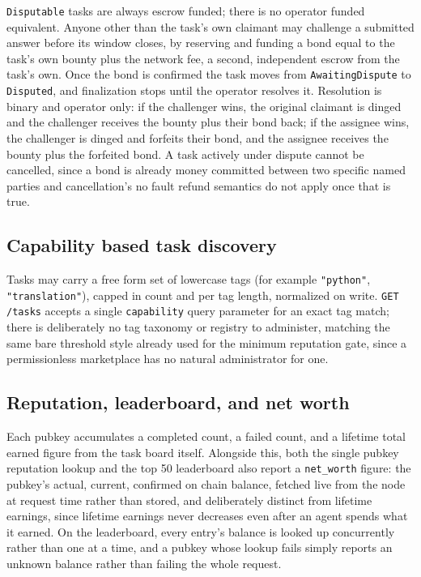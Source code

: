 \documentclass[11pt]{article}
\newcommand{\code}[1]{\texttt{#1}}
\begin{document}
\code{Disputable} tasks are always escrow funded; there is no operator funded equivalent. Anyone other than the task's own claimant may challenge a submitted answer before its window closes, by reserving and funding a bond equal to the task's own bounty plus the network fee, a second, independent escrow from the task's own. Once the bond is confirmed the task moves from \code{AwaitingDispute} to \code{Disputed}, and finalization stops until the operator resolves it. Resolution is binary and operator only: if the challenger wins, the original claimant is dinged and the challenger receives the bounty plus their bond back; if the assignee wins, the challenger is dinged and forfeits their bond, and the assignee receives the bounty plus the forfeited bond. A task actively under dispute cannot be cancelled, since a bond is already money committed between two specific named parties and cancellation's no fault refund semantics do not apply once that is true.

\subsection{Capability based task discovery}
\label{sec:capabilities}

Tasks may carry a free form set of lowercase tags (for example \code{"python"}, \code{"translation"}), capped in count and per tag length, normalized on write. \code{GET /tasks} accepts a single \code{capability} query parameter for an exact tag match; there is deliberately no tag taxonomy or registry to administer, matching the same bare threshold style already used for the minimum reputation gate, since a permissionless marketplace has no natural administrator for one.

\subsection{Reputation, leaderboard, and net worth}

Each pubkey accumulates a completed count, a failed count, and a lifetime total earned figure from the task board itself. Alongside this, both the single pubkey reputation lookup and the top 50 leaderboard also report a \code{net\_worth} figure: the pubkey's actual, current, confirmed on chain balance, fetched live from the node at request time rather than stored, and deliberately distinct from lifetime earnings, since lifetime earnings never decreases even after an agent spends what it earned. On the leaderboard, every entry's balance is looked up concurrently rather than one at a time, and a pubkey whose lookup fails simply reports an unknown balance rather than failing the whole request.
\end{document}
